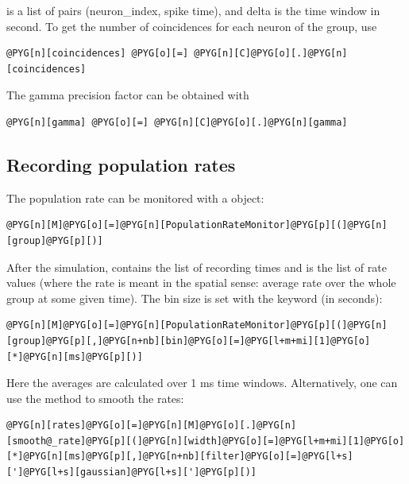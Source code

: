 \documentclass[letterpaper,10pt,english]{manual}
\begin{document}
 is a list of pairs (neuron\_index, spike time), and delta is the time window
in second. To get the number of coincidences for each neuron of the group, use

\begin{Verbatim}[commandchars=@\[\]]
@PYG[n][coincidences] @PYG[o][=] @PYG[n][C]@PYG[o][.]@PYG[n][coincidences]
\end{Verbatim}

The gamma precision factor can be obtained with

\begin{Verbatim}[commandchars=@\[\]]
@PYG[n][gamma] @PYG[o][=] @PYG[n][C]@PYG[o][.]@PYG[n][gamma]
\end{Verbatim}


\subsection{Recording population rates}

The population rate can be monitored with a \hyperlink{brian.PopulationRateMonitor}{} object:

\begin{Verbatim}[commandchars=@\[\]]
@PYG[n][M]@PYG[o][=]@PYG[n][PopulationRateMonitor]@PYG[p][(]@PYG[n][group]@PYG[p][)]
\end{Verbatim}

After the simulation,  contains the list of recording times and
 is the list of rate values (where the rate is meant in the spatial sense: average rate over
the whole group at some given time). The bin size is set with the  keyword (in seconds):

\begin{Verbatim}[commandchars=@\[\]]
@PYG[n][M]@PYG[o][=]@PYG[n][PopulationRateMonitor]@PYG[p][(]@PYG[n][group]@PYG[p][,]@PYG[n+nb][bin]@PYG[o][=]@PYG[l+m+mi][1]@PYG[o][*]@PYG[n][ms]@PYG[p][)]
\end{Verbatim}

Here the averages are calculated over 1 ms time windows. Alternatively, one can use the
 method to smooth the rates:

\begin{Verbatim}[commandchars=@\[\]]
@PYG[n][rates]@PYG[o][=]@PYG[n][M]@PYG[o][.]@PYG[n][smooth@_rate]@PYG[p][(]@PYG[n][width]@PYG[o][=]@PYG[l+m+mi][1]@PYG[o][*]@PYG[n][ms]@PYG[p][,]@PYG[n+nb][filter]@PYG[o][=]@PYG[l+s][']@PYG[l+s][gaussian]@PYG[l+s][']@PYG[p][)]
\end{Verbatim}
\end{document}

